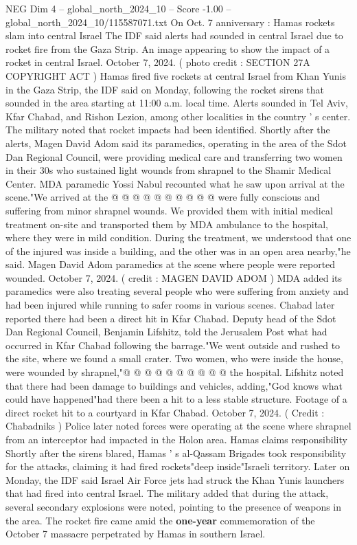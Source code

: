 \begin{textsample}{NEG Dim 4 – global\_north\_2024\_10 – Score -1.00 – global\_north\_2024\_10/115587071.txt}  \label{ex:f4_neg_053}
On Oct. 7 anniversary : Hamas rockets slam into central Israel The IDF said alerts had sounded in central Israel due to rocket fire from the Gaza Strip.
An image appearing to show the impact of a rocket in central Israel.
October 7, 2024. ( photo credit : SECTION 27A COPYRIGHT ACT ) Hamas fired five rockets at central Israel from Khan Yunis in the Gaza Strip, the IDF said on Monday, following the rocket sirens that sounded in the area starting at 11:00 a.m. local time.
Alerts sounded in Tel Aviv, Kfar Chabad, and Rishon Lezion, among other localities in the country ' s center.
The military noted that rocket impacts had been identified.
Shortly after the alerts, Magen David Adom said its paramedics, operating in the area of the Sdot Dan Regional Council, were providing medical care and transferring two women in their 30s who sustained light wounds from shrapnel to the Shamir Medical Center.
MDA paramedic Yossi Nabul recounted what he saw upon arrival at the scene."We arrived at the @ @ @ @ @ @ @ @ @ @ were fully conscious and suffering from minor shrapnel wounds.
We provided them with initial medical treatment on-site and transported them by MDA ambulance to the hospital, where they were in mild condition.
During the treatment, we understood that one of the injured was inside a building, and the other was in an open area nearby,"he said.
Magen David Adom paramedics at the scene where people were reported wounded.
October 7, 2024. ( credit : MAGEN DAVID ADOM ) MDA added its paramedics were also treating several people who were suffering from anxiety and had been injured while running to safer rooms in various scenes.
Chabad later reported there had been a direct hit in Kfar Chabad.
Deputy head of the Sdot Dan Regional Council, Benjamin Lifshitz, told the Jerusalem Post what had occurred in Kfar Chabad following the barrage."We went outside and rushed to the site, where we found a small crater.
Two women, who were inside the house, were wounded by shrapnel,"@ @ @ @ @ @ @ @ @ @ the hospital.
Lifshitz noted that there had been damage to buildings and vehicles, adding,"God knows what could have happened"had there been a hit to a less stable structure.
Footage of a direct rocket hit to a courtyard in Kfar Chabad.
October 7, 2024. ( Credit : Chabadniks ) Police later noted forces were operating at the scene where shrapnel from an interceptor had impacted in the Holon area.
Hamas claims responsibility Shortly after the sirens blared, Hamas ' s al-Qassam Brigades took responsibility for the attacks, claiming it had fired rockets"deep inside"Israeli territory.
Later on Monday, the IDF said Israel Air Force jets had struck the Khan Yunis launchers that had fired into central Israel.
The military added that during the attack, several secondary explosions were noted, pointing to the presence of weapons in the area.
The rocket fire came amid the \textbf{one-year} commemoration of the October 7 massacre perpetrated by Hamas in southern Israel.

\end{textsample}
